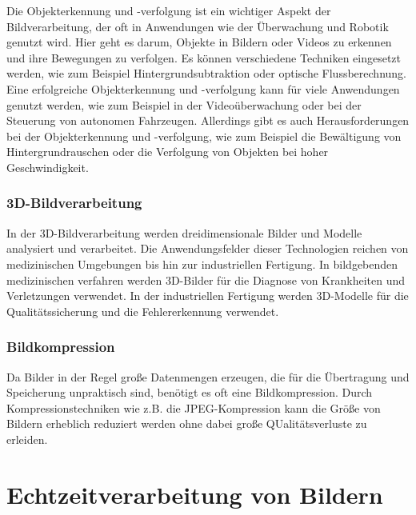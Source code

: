         Die Objekterkennung und -verfolgung ist ein wichtiger Aspekt der Bildverarbeitung, der oft in Anwendungen wie der Überwachung und Robotik genutzt wird. 
        Hier geht es darum, Objekte in Bildern oder Videos zu erkennen und ihre Bewegungen zu verfolgen. 
        Es können verschiedene Techniken eingesetzt werden, wie zum Beispiel Hintergrundsubtraktion oder optische Flussberechnung.
        Eine erfolgreiche Objekterkennung und -verfolgung kann für viele Anwendungen genutzt werden, wie zum Beispiel in der Videoüberwachung oder bei der Steuerung von autonomen Fahrzeugen. 
        Allerdings gibt es auch Herausforderungen bei der Objekterkennung und -verfolgung, wie zum Beispiel die Bewältigung von Hintergrundrauschen oder die Verfolgung von Objekten bei hoher Geschwindigkeit.
    
    \subsubsection{3D-Bildverarbeitung}
        In der 3D-Bildverarbeitung werden dreidimensionale Bilder und Modelle analysiert und verarbeitet.
        Die Anwendungsfelder dieser Technologien reichen von medizinischen Umgebungen bis hin zur industriellen Fertigung.
        In bildgebenden medizinischen verfahren werden 3D-Bilder für die Diagnose von Krankheiten und Verletzungen verwendet. 
        In der industriellen Fertigung werden 3D-Modelle für die Qualitätssicherung und die Fehlererkennung verwendet.
    
    \subsubsection{Bildkompression}
        Da Bilder in der Regel große Datenmengen erzeugen, die für die Übertragung und Speicherung unpraktisch sind, benötigt es oft eine Bildkompression. 
        Durch Kompressionstechniken wie z.B. die JPEG-Kompression kann die Größe von Bildern erheblich reduziert werden ohne dabei große QUalitätsverluste zu erleiden.
    
\section{Echtzeitverarbeitung von Bildern}

